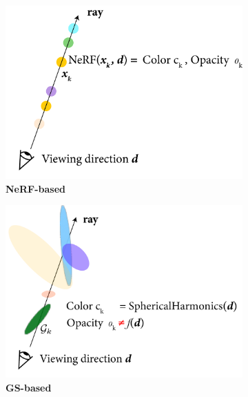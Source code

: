 \begin{figure}[htpb!]
  \centering
  \begin{subfigure}[b]{0.31\linewidth}
    \includegraphics[width=\linewidth]{images/gaussiansplatting/nerf.png}
    \caption{\textbf{NeRF-based}}
    \label{fig:nerf-ray}
  \end{subfigure}
  \quad %
  \begin{subfigure}[b]{0.31\linewidth}
    \includegraphics[width=\linewidth]{images/gaussiansplatting/gs_vanilla.png}
    \caption{\textbf{GS-based}}
    \label{fig:gs-ray}
  \end{subfigure}
  \quad %
  \begin{subfigure}[b]{0.31\linewidth}

\end{subfigure}
\end{figure}
